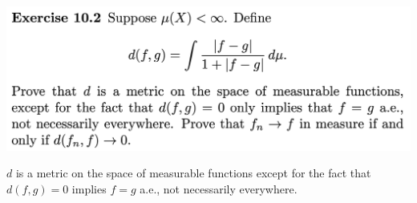 

\newpage
\begin{mdframed}
\includegraphics[width=400pt]{img/analysis--berkeley-202a-hw09-b4e1.png}
\end{mdframed}




\begin{claim*}
  $d$ is a metric on the space of measurable functions except for the fact that $d(f, g) = 0$ implies $f = g$
  a.e., not necessarily everywhere.
\end{claim*}

